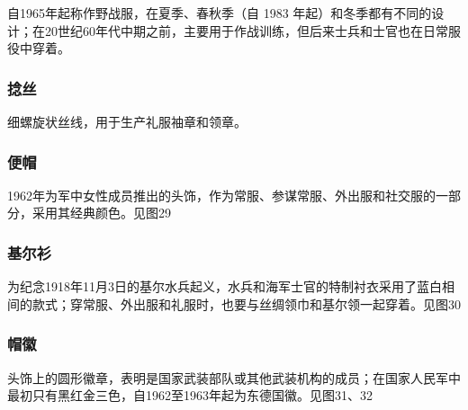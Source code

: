 自1965年起称作野战服，在夏季、春秋季（自 1983 年起）和冬季都有不同的设计；在20世纪60年代中期之前，主要用于作战训练，但后来士兵和士官也在日常服役中穿着。

\subsubsection*{捻丝}%

细螺旋状丝线，用于生产礼服袖章和领章。

\subsubsection*{便帽}%

1962年为军中女性成员推出的头饰，作为常服、参谋常服、外出服和社交服的一部分，采用其经典颜色。见图29

\subsubsection*{基尔衫}%

为纪念1918年11月3日的基尔水兵起义，水兵和海军士官的特制衬衣采用了蓝白相间的款式；穿常服、外出服和礼服时，也要与丝绸领巾和基尔领一起穿着。见图30

\subsubsection*{帽徽}%

头饰上的圆形徽章，表明是国家武装部队或其他武装机构的成员；在国家人民军中最初只有黑红金三色，自1962至1963年起为东德国徽。见图31、32


